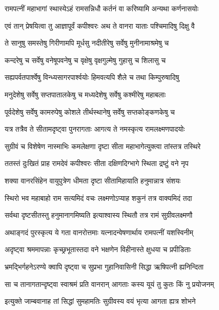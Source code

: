 \twolineshloka
{रामपत्नीं महाभागां स्थास्येऽहं रामसन्निधौ}
{कर्तनं वा करिष्यामि अन्यथा कर्णनासयोः} %

\twolineshloka
{एवं तान् प्रेषयित्वा तु आज्ञापूर्वं कपीश्वरः}
{अथ ते वानरा याताः पश्चिमादिषु दिक्षु वै} %

\twolineshloka
{ते सानुषु समस्तेषु गिरीणामपि मूर्धसु}
{नदीतीरेषु सर्वेषु मुनीनामाश्रमेषु च} %

\twolineshloka
{कन्दरेषु च सर्वेषु वनेषूपवनेषु च}
{वृक्षेषु वृक्षगुल्मेषु गुहासु च शिलासु च} %

\twolineshloka
{सह्यपर्वतपार्श्वेषु विन्ध्यसागरपार्श्वयोः}
{हिमवत्यपि शैले च तथा किम्पुरुषादिषु} %

\twolineshloka
{मनुदेशेषु सर्वेषु सप्तपातालकेषु च}
{मध्यदेशेषु सर्वेषु कश्मीरेषु महाबलाः} %

\twolineshloka
{पूर्वदेशेषु सर्वेषु कामरुपेषु कोशले}
{तीर्थस्थानेषु सर्वेषु सप्तकोङ्कणकेषु च} %

\twolineshloka
{यत्र तत्रैव ते सीतामदृष्ट्वा पुनरागताः}
{आगत्य ते नमस्कृत्य रामलक्ष्मणपादयोः} %

\twolineshloka
{सुग्रीवं च विशेषेण नास्माभिः कमलेक्षणा}
{दृष्टा सीता महाभागेत्युक्त्वा तांस्तत्र तस्थिरे} %

\twolineshloka
{ततस्तं दुःखितं प्राह रामदेवं कपीश्वरः}
{सीता दक्षिणदिग्भागे स्थिता द्रष्टुं वने नृप} %

\twolineshloka
{शक्या वानरसिंहेन वायुपुत्रेण धीमता}
{दृष्टा सीतामिहायाति हनुमान्नात्र संशयः} %

\twolineshloka
{स्थिरो भव महाबाहो राम सत्यमिदं वचः}
{लक्ष्मणोऽप्याह शकुनं तत्र वाक्यमिदं तदा} %

\twolineshloka
{सर्वथा दृष्टसीतस्तु हनुमानागमिष्यति}
{इत्याश्वास्य स्थितौ तत्र रामं सुग्रीवलक्ष्मणौ} %

\twolineshloka
{अथाङ्गदं पुरस्कृत्य ये गता वानरोत्तमाः}
{यत्नादन्वेषणार्थाय रामपत्नीं यशस्विनीम्} %

\twolineshloka
{अदृष्ट्वा श्रममापन्नाः कृच्छ्रभूतास्तदा वने}
{भक्षणेन विहीनास्ते क्षुधया च प्रपीडिताः} %

\twolineshloka
{भ्रमद्भिर्गहनेऽरण्ये क्वापि दृष्ट्वा च सुप्रभा}
{गुहानिवासिनी सिद्धा ऋषिपत्नी ह्यनिन्दिता} %

\twolineshloka
{सा च तानागतान्दृष्ट्वा स्वाश्रमं प्रति वानरान्}
{आगताः कस्य यूयं तु कुतः किं नु प्रयोजनम्} %

\twolineshloka
{इत्युक्ते जाम्बवानाह तां सिद्धां सुमहामतिः}
{सुग्रीवस्य वयं भृत्या आगता ह्यत्र शोभने} %

